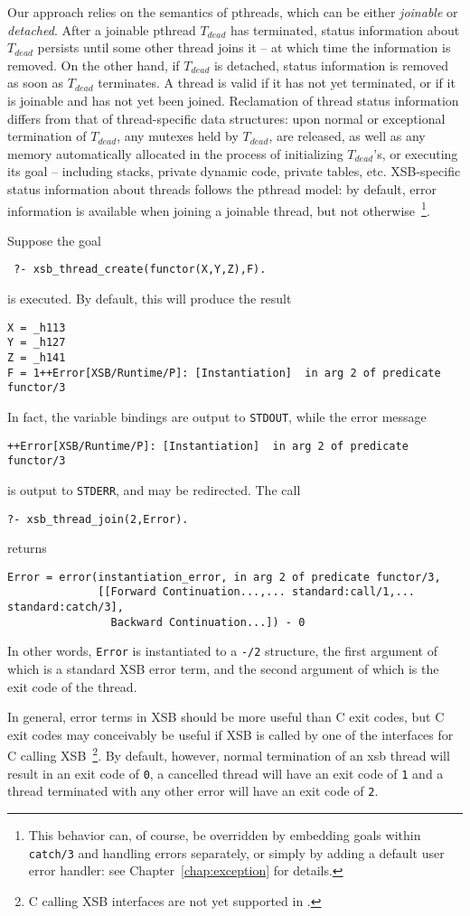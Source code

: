 Our approach relies on the semantics of pthreads, which can be either
{\em joinable} or {\em detached}.  After a joinable pthread $T_{dead}$
has terminated, status information about $T_{dead}$ persists until
some other thread joins it -- at which time the information is
removed.  On the other hand, if $T_{dead}$ is detached, status
information is removed as soon as $T_{dead}$ terminates.  A thread is
valid if it has not yet terminated, or if it is joinable and has not
yet been joined.  Reclamation of thread status information differs
from that of thread-specific data structures: upon normal or
exceptional termination of $T_{dead}$, any mutexes held by $T_{dead}$,
are released, as well as any memory automatically allocated in the
process of initializing $T_{dead}$'s, or executing its goal --
including stacks, private dynamic code, private tables, etc.
XSB-specific status information about threads follows the pthread
model: by default, error information is available when joining a
joinable thread, but not otherwise~\footnote{This behavior can, of
  course, be overridden by embedding goals within {\tt catch/3} and
  handling errors separately, or simply by adding a default user error
  handler: see Chapter~\ref{chap:exception} for details.}.

\begin{example}
Suppose the goal 
\begin{verbatim}
 ?- xsb_thread_create(functor(X,Y,Z),F).
\end{verbatim}
%
is executed.  By default, this will produce the result
%
\begin{verbatim}
X = _h113
Y = _h127
Z = _h141
F = 1++Error[XSB/Runtime/P]: [Instantiation]  in arg 2 of predicate functor/3
\end{verbatim}
%
In fact, the variable bindings are output to {\tt STDOUT}, while the
error message
%
\begin{verbatim}
++Error[XSB/Runtime/P]: [Instantiation]  in arg 2 of predicate functor/3
\end{verbatim}
%
is output to {\tt STDERR}, and may be redirected.  The call
%
\begin{verbatim}
?- xsb_thread_join(2,Error).
\end{verbatim}
%
returns
%
\begin{verbatim}
Error = error(instantiation_error, in arg 2 of predicate functor/3,
              [[Forward Continuation...,... standard:call/1,... standard:catch/3],
                Backward Continuation...]) - 0
\end{verbatim}
%
In other words, {\tt Error} is instantiated to a {\tt -/2} structure,
the first argument of which is a standard XSB error term, and the
second argument of which is the exit code of the thread.  
\end{example}
%
In general, error terms in XSB should be more useful than C exit
codes, but C exit codes may conceivably be useful if XSB is called by
one of the interfaces for C calling XSB~\footnote{C calling XSB
  interfaces are not yet supported in \version.}.  By default,
however, normal termination of an xsb thread will result in an exit
code of {\tt 0}, a cancelled thread will have an exit code of {\tt 1}
and a thread terminated with any other error will have an exit code of
{\tt 2}.

